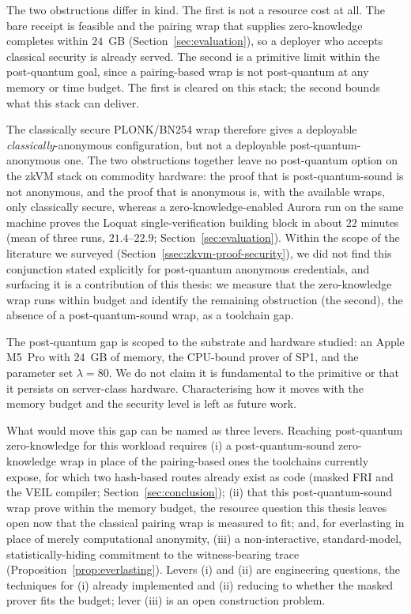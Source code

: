 The two obstructions differ in kind. The first is not a resource cost at all. The bare receipt is feasible and the pairing wrap that supplies zero-knowledge completes within $24$~GB (Section~\ref{sec:evaluation}), so a deployer who accepts classical security is already served. The second is a primitive limit within the post-quantum goal, since a pairing-based wrap is not post-quantum at any memory or time budget. The first is cleared on this stack; the second bounds what this stack can deliver.

The classically secure PLONK/BN254 wrap therefore gives a deployable \emph{classically}-anonymous configuration, but not a deployable post-quantum-anonymous one. The two obstructions together leave no post-quantum option on the zkVM stack on commodity hardware: the proof that is post-quantum-sound is not anonymous, and the proof that is anonymous is, with the available wraps, only classically secure, whereas a zero-knowledge-enabled Aurora run on the same machine proves the Loquat single-verification building block in about $22$ minutes (mean of three runs, $21.4$--$22.9$; Section~\ref{sec:evaluation}). Within the scope of the literature we surveyed (Section~\ref{ssec:zkvm-proof-security}), we did not find this conjunction stated explicitly for post-quantum anonymous credentials, and surfacing it is a contribution of this thesis: we measure that the zero-knowledge wrap runs within budget and identify the remaining obstruction (the second), the absence of a post-quantum-sound wrap, as a toolchain gap.

The post-quantum gap is scoped to the substrate and hardware studied: an Apple M5~Pro with $24$~GB of memory, the CPU-bound prover of SP1, and the parameter set $\lambda=80$. We do not claim it is fundamental to the primitive or that it persists on server-class hardware. Characterising how it moves with the memory budget and the security level is left as future work.

What would move this gap can be named as three levers. Reaching post-quantum zero-knowledge for this workload requires (i) a post-quantum-sound zero-knowledge wrap in place of the pairing-based ones the toolchains currently expose, for which two hash-based routes already exist as code (masked {FRI} and the {VEIL} compiler; Section~\ref{sec:conclusion}); (ii) that this post-quantum-sound wrap prove within the memory budget, the resource question this thesis leaves open now that the classical pairing wrap is measured to fit; and, for everlasting in place of merely computational anonymity, (iii) a non-interactive, standard-model, statistically-hiding commitment to the witness-bearing trace (Proposition~\ref{prop:everlasting}). Levers (i) and (ii) are engineering questions, the techniques for (i) already implemented and (ii) reducing to whether the masked prover fits the budget; lever (iii) is an open construction problem.

